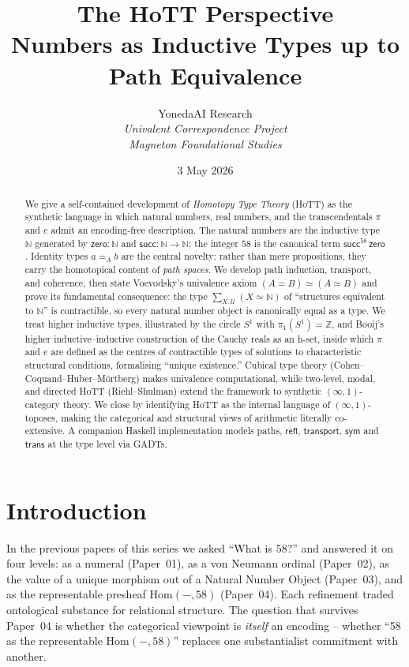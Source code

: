 \documentclass[12pt]{article}
\title{The HoTT Perspective\\
\large Numbers as Inductive Types up to Path Equivalence}
\author{YonedaAI Research \\
\textit{Univalent Correspondence Project} \\
\textit{Magneton Foundational Studies}}
\date{3 May 2026}
\theoremstyle{definition}
\theoremstyle{remark}
\newcommand{\U}{\mathcal{U}}
\newcommand{\N}{\mathbb{N}}
\newcommand{\Z}{\mathbb{Z}}
\newcommand{\refl}{\mathsf{refl}}
\newcommand{\zero}{\mathsf{zero}}
\newcommand{\suc}{\mathsf{succ}}
\newcommand{\transport}{\mathsf{transport}}
\newcommand{\eqv}{\simeq}
\newcommand{\Sone}{S^1}
\begin{document}
\maketitle

\begin{abstract}
We give a self-contained development of \emph{Homotopy Type Theory} (HoTT) as
the synthetic language in which natural numbers, real numbers, and the
transcendentals $\pi$ and $e$ admit an encoding-free description. The natural
numbers are the inductive type $\N$ generated by $\zero : \N$ and
$\suc : \N \to \N$; the integer $58$ is the canonical term
$\suc^{58}\,\zero$. Identity types $a =_A b$ are the central novelty: rather
than mere propositions, they carry the homotopical content of \emph{path
spaces}. We develop path induction, transport, and coherence, then state
Voevodsky's univalence axiom $(A = B) \eqv (A \eqv B)$ and prove its
fundamental consequence: the type $\sum_{X : \U}(X \eqv \N)$ of
``structures equivalent to $\N$'' is contractible, so every natural number
object is canonically equal as a type. We treat higher inductive types,
illustrated by the circle $\Sone{}$ with $\pi_1(\Sone{}) = \Z$, and Booij's
higher inductive--inductive construction of the Cauchy reals as an h-set,
inside which $\pi$ and $e$ are defined as the centres of contractible types
of solutions to characteristic structural conditions, formalising
``unique existence.'' Cubical type theory
(Cohen--Coquand--Huber--M\"ortberg) makes univalence computational, while
two-level, modal, and directed HoTT (Riehl--Shulman) extend the framework to
synthetic $(\infty, 1)$-category theory. We close by identifying HoTT as the
internal language of $(\infty,1)$-toposes, making the categorical and
structural views of arithmetic literally co-extensive. A companion Haskell
implementation models paths, $\refl$, $\transport$, $\mathsf{sym}$ and
$\mathsf{trans}$ at the type level via GADTs.
\end{abstract}

\tableofcontents

\section{Introduction}
\label{sec:intro}

In the previous papers of this series we asked ``What is $58$?'' and answered
it on four levels: as a numeral (Paper~01), as a von Neumann ordinal
(Paper~02), as the value of a unique morphism out of a Natural Number Object
(Paper~03), and as the representable presheaf $\mathrm{Hom}(-, 58)$
(Paper~04). Each refinement traded ontological substance for relational
structure. The question that survives Paper~04 is whether the categorical
viewpoint is \emph{itself} an encoding -- whether ``58 as the representable
$\mathrm{Hom}(-,58)$'' replaces one substantialist commitment with another.
\end{document}

